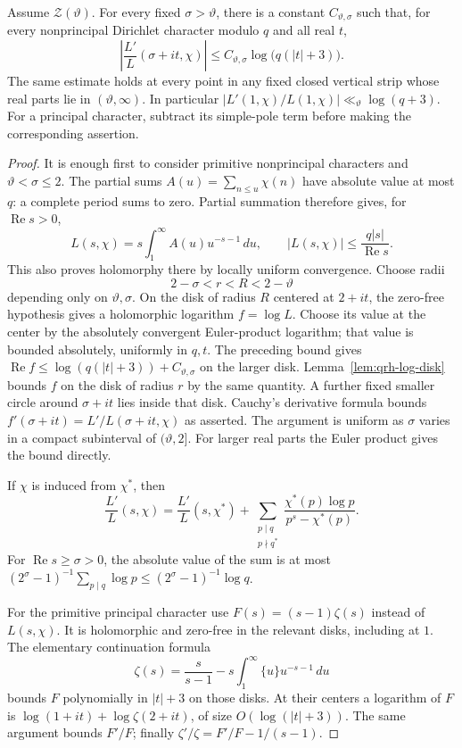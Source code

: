 \begin{proposition}
\label{prop:qrh-log-derivative}
Assume $\mathcal Z(\vartheta)$. For every fixed
$\sigma>\vartheta$, there is a constant $C_{\vartheta,\sigma}$
such that, for every nonprincipal Dirichlet character modulo
$q$ and all real $t$,
\[
 \left|\frac{L'}{L}(\sigma+it,\chi)\right|
 \le C_{\vartheta,\sigma}\log\bigl(q(|t|+3)\bigr).
\]
The same estimate holds at every point in any fixed closed
vertical strip whose real parts lie in
$(\vartheta,\infty)$. In particular
$|L'(1,\chi)/L(1,\chi)|\ll_\vartheta\log(q+3)$.
For a principal character, subtract its simple-pole term
before making the corresponding assertion.
\end{proposition}
\begin{proof}
It is enough first to consider primitive nonprincipal
characters and $\vartheta<\sigma\le2$. The partial sums
$A(u)=\sum_{n\le u}\chi(n)$ have absolute value at most $q$:
a complete period sums to zero. Partial summation therefore
gives, for $\operatorname{Re}s>0$,
\[
 L(s,\chi)=s\int_1^\infty A(u)u^{-s-1}\,du,
 \qquad |L(s,\chi)|\le\frac{q|s|}{\operatorname{Re}s}.
\]
This also proves holomorphy there by locally uniform
convergence. Choose radii
\[
 2-\sigma<r<R<2-\vartheta
\]
depending only on $\vartheta,\sigma$. On the disk of radius
$R$ centered at $2+it$, the zero-free hypothesis gives a
holomorphic logarithm $f=\log L$. Choose its value at the
center by the absolutely convergent Euler-product logarithm;
that value is bounded absolutely, uniformly in $q,t$.
The preceding bound gives
$\operatorname{Re}f\le\log(q(|t|+3))+C_{\vartheta,\sigma}$
on the larger disk. Lemma~\ref{lem:qrh-log-disk} bounds $f$
on the disk of radius $r$ by the same quantity.
A further fixed smaller circle around $\sigma+it$ lies
inside that disk. Cauchy's derivative formula bounds
$f'(\sigma+it)=L'/L(\sigma+it,\chi)$ as asserted.
The argument is uniform as $\sigma$ varies in a compact
subinterval of $(\vartheta,2]$. For larger real parts the
Euler product gives the bound directly.

If $\chi$ is induced from $\chi^*$, then
\[
 \frac{L'}L(s,\chi)=\frac{L'}L(s,\chi^*)+
 \sum_{\substack{p\mid q\\p\nmid q^*}}
       \frac{\chi^*(p)\log p}{p^s-\chi^*(p)}.
\]
For $\operatorname{Re}s\ge\sigma>0$, the absolute value of
the sum is at most
$(2^\sigma-1)^{-1}\sum_{p\mid q}\log p
\le(2^\sigma-1)^{-1}\log q$.

For the primitive principal character use
$F(s)=(s-1)\zeta(s)$ instead of $L(s,\chi)$. It is
holomorphic and zero-free in the relevant disks, including
at $1$. The elementary continuation formula
\[
 \zeta(s)=\frac{s}{s-1}
          -s\int_1^\infty\{u\}u^{-s-1}\,du
\]
bounds $F$ polynomially in $|t|+3$ on those disks.
At their centers a logarithm of $F$ is
$\log(1+it)+\log\zeta(2+it)$, of size
$O(\log(|t|+3))$. The same argument bounds $F'/F$;
finally $\zeta'/\zeta=F'/F-1/(s-1)$.
\end{proof}

